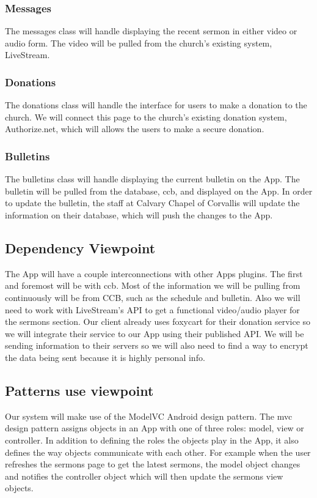 \documentclass[letterpaper,10pt,draftclsnofoot,onecolumn,titlepage]{IEEEtran}
\begin{document}
			\subsubsection{Messages}
				The messages class will handle displaying the recent sermon in either video or audio form.
				The video will be pulled from the church's existing system, LiveStream.

			\subsubsection{Donations}
				The donations class will handle the interface for users to make a donation to the church.
				We will connect this page to the church's existing donation system, Authorize.net, which will allows the users to make a secure donation.

			\subsubsection{Bulletins}
				The bulletins class will handle displaying the current bulletin on the \gls{App}.
				The bulletin will be pulled from the database, \gls{ccb}, and displayed on the \gls{App}.
				In order to update the bulletin, the staff at Calvary Chapel of Corvallis will update the information on their database, which will push the changes to the \gls{App}.

		\subsection{Dependency Viewpoint}
			The \gls{App} will have a couple interconnections with other \glspl{App} plugins.
			The first and foremost will be with \gls{ccb}.
			Most of the information we will be pulling from continuously will be from CCB, such as the schedule and bulletin.
			Also we will need to work with LiveStream's API to get a functional video/audio player for the sermons section.
			Our client already uses foxycart for their donation service so we will integrate their service to our \gls{App} using their published API.
			We will be sending information to their servers so we will also need to find a way to encrypt the data being sent because it is highly personal info.

		\subsection{Patterns use viewpoint}
			Our system will make use of the \gls{ModelVC} \gls{Android} design pattern.
			The \gls{mvc} design pattern assigns objects in an \gls{App} with one of three roles: model, view or controller.
			In addition to defining the roles the objects play in the \gls{App}, it also defines the way objects communicate with each other.
			For example when the user refreshes the sermons page to get the latest sermons, the model object changes and notifies the controller object which will then update the sermons view objects.
\end{document}
